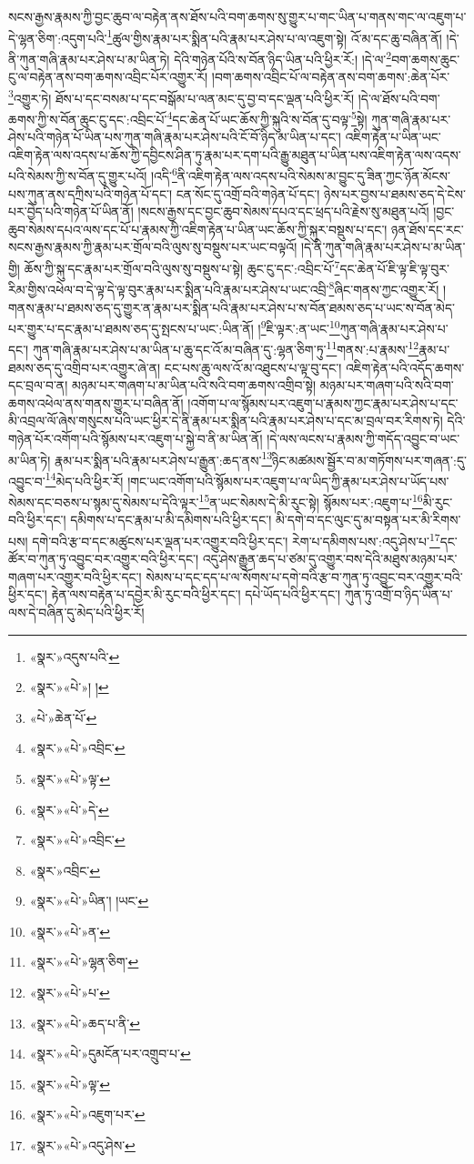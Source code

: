 སངས་རྒྱས་རྣམས་ཀྱི་བྱང་ཆུབ་ལ་བརྟེན་ནས་ཐོས་པའི་བག་ཆགས་སུ་གྱུར་པ་གང་ཡིན་པ་གནས་གང་ལ་འཇུག་པ་དེ་ལྷན་ཅིག་:འདུག་པའི་\footnote{«སྣར་»འདུས་པའི་}ཚུལ་གྱིས་རྣམ་པར་སྨིན་པའི་རྣམ་པར་ཤེས་པ་ལ་འཇུག་སྟེ། འོ་མ་དང་ཆུ་བཞིན་ནོ། །དེ་ནི་ཀུན་གཞི་རྣམ་པར་ཤེས་པ་མ་ཡིན་ཏེ། དེའི་གཉེན་པོའི་ས་བོན་ཉིད་ཡིན་པའི་ཕྱིར་རོ:། །དེ་ལ་\footnote{«སྣར་»«པེ་»། །}བག་ཆགས་ཆུང་ངུ་ལ་བརྟེན་ནས་བག་ཆགས་འབྲིང་པོར་འགྱུར་རོ། །བག་ཆགས་འབྲིང་པོ་ལ་བརྟེན་ནས་བག་ཆགས་:ཆེན་པོར་\footnote{«པེ་»ཆེན་པོ་}འགྱུར་ཏེ། ཐོས་པ་དང་བསམ་པ་དང་བསྒོམ་པ་ལན་མང་དུ་བྱ་བ་དང་ལྡན་པའི་ཕྱིར་རོ། །དེ་ལ་ཐོས་པའི་བག་ཆགས་ཀྱི་ས་བོན་ཆུང་ངུ་དང་:འབྲིང་པོ་\footnote{«སྣར་»«པེ་»འབྲིང་}དང་ཆེན་པོ་ཡང་ཆོས་ཀྱི་སྐུའི་ས་བོན་དུ་བལྟ་\footnote{«སྣར་»«པེ་»ལྟ་}སྟེ། ཀུན་གཞི་རྣམ་པར་ཤེས་པའི་གཉེན་པོ་ཡིན་པས་ཀུན་གཞི་རྣམ་པར་ཤེས་པའི་ངོ་བོ་ཉིད་མ་ཡིན་པ་དང་། འཇིག་རྟེན་པ་ཡིན་ཡང་འཇིག་རྟེན་ལས་འདས་པ་ཆོས་ཀྱི་དབྱིངས་ཤིན་ཏུ་རྣམ་པར་དག་པའི་རྒྱུ་མཐུན་པ་ཡིན་པས་འཇིག་རྟེན་ལས་འདས་པའི་སེམས་ཀྱི་ས་བོན་དུ་གྱུར་པའོ། །འདི་\footnote{«སྣར་»«པེ་»དེ་}ནི་འཇིག་རྟེན་ལས་འདས་པའི་སེམས་མ་བྱུང་དུ་ཟིན་ཀྱང་ཉོན་མོངས་པས་ཀུན་ནས་དཀྲིས་པའི་གཉེན་པོ་དང་། ངན་སོང་དུ་འགྲོ་བའི་གཉེན་པོ་དང་། ཉེས་པར་བྱས་པ་ཐམས་ཅད་དེ་ངེས་པར་བྱེད་པའི་གཉེན་པོ་ཡིན་ནོ། །སངས་རྒྱས་དང་བྱང་ཆུབ་སེམས་དཔའ་དང་ཕྲད་པའི་རྗེས་སུ་མཐུན་པའོ། །བྱང་ཆུབ་སེམས་དཔའ་ལས་དང་པོ་པ་རྣམས་ཀྱི་འཇིག་རྟེན་པ་ཡིན་ཡང་ཆོས་ཀྱི་སྐུར་བསྡུས་པ་དང་། ཉན་ཐོས་དང་རང་སངས་རྒྱས་རྣམས་ཀྱི་རྣམ་པར་གྲོལ་བའི་ལུས་སུ་བསྡུས་པར་ཡང་བལྟའོ། །དེ་ནི་ཀུན་གཞི་རྣམ་པར་ཤེས་པ་མ་ཡིན་གྱི། ཆོས་ཀྱི་སྐུ་དང་རྣམ་པར་གྲོལ་བའི་ལུས་སུ་བསྡུས་པ་སྟེ། ཆུང་ངུ་དང་:འབྲིང་པོ་\footnote{«སྣར་»«པེ་»འབྲིང་}དང་ཆེན་པོ་ཇི་ལྟ་ཇི་ལྟ་བུར་རིམ་གྱིས་འཕེལ་བ་དེ་ལྟ་དེ་ལྟ་བུར་རྣམ་པར་སྨིན་པའི་རྣམ་པར་ཤེས་པ་ཡང་འབྲི་\footnote{«སྣར་»འབྲིང་}ཞིང་གནས་ཀྱང་འགྱུར་རོ། །གནས་རྣམ་པ་ཐམས་ཅད་དུ་གྱུར་ན་རྣམ་པར་སྨིན་པའི་རྣམ་པར་ཤེས་པ་ས་བོན་ཐམས་ཅད་པ་ཡང་ས་བོན་མེད་པར་གྱུར་པ་དང་རྣམ་པ་ཐམས་ཅད་དུ་སྤངས་པ་ཡང་:ཡིན་ནོ། །\footnote{«སྣར་»«པེ་»ཡིན་། །ཡང་}ཇི་ལྟར་:ན་ཡང་\footnote{«སྣར་»«པེ་»ན་}ཀུན་གཞི་རྣམ་པར་ཤེས་པ་དང་། ཀུན་གཞི་རྣམ་པར་ཤེས་པ་མ་ཡིན་པ་ཆུ་དང་འོ་མ་བཞིན་དུ་:ལྷན་ཅིག་ཏུ་\footnote{«སྣར་»«པེ་»ལྷན་ཅིག་}གནས་:པ་རྣམས་\footnote{«སྣར་»«པེ་»པ་}རྣམ་པ་ཐམས་ཅད་དུ་འགྲིབ་པར་འགྱུར་ཞེ་ན། ངང་པས་ཆུ་ལས་འོ་མ་འཐུངས་པ་ལྟ་བུ་དང་། འཇིག་རྟེན་པའི་འདོད་ཆགས་དང་བྲལ་བ་ན། མཉམ་པར་གཞག་པ་མ་ཡིན་པའི་སའི་བག་ཆགས་འགྲིབ་སྟེ། མཉམ་པར་གཞག་པའི་སའི་བག་ཆགས་འཕེལ་ནས་གནས་གྱུར་པ་བཞིན་ནོ། །འགོག་པ་ལ་སྙོམས་པར་འཇུག་པ་རྣམས་ཀྱང་རྣམ་པར་ཤེས་པ་དང་མི་འབྲལ་ལོ་ཞེས་གསུངས་པའི་ཡང་ཕྱིར་དེ་ནི་རྣམ་པར་སྨིན་པའི་རྣམ་པར་ཤེས་པ་དང་མ་བྲལ་བར་རིགས་ཏེ། དེའི་གཉེན་པོར་འགོག་པའི་སྙོམས་པར་འཇུག་པ་སྐྱེ་བ་ནི་མ་ཡིན་ནོ། །དེ་ལས་ལངས་པ་རྣམས་ཀྱི་གདོད་འབྱུང་བ་ཡང་མ་ཡིན་ཏེ། རྣམ་པར་སྨིན་པའི་རྣམ་པར་ཤེས་པ་རྒྱུན་:ཆད་ནས་\footnote{«སྣར་»«པེ་»ཆད་པ་ནི་}ཉིང་མཚམས་སྦྱོར་བ་མ་གཏོགས་པར་གཞན་:དུ་འབྱུང་བ་\footnote{«སྣར་»«པེ་»དུམངོན་པར་འགྲུབ་པ་}མེད་པའི་ཕྱིར་རོ། །གང་ཡང་འགོག་པའི་སྙོམས་པར་འཇུག་པ་ལ་ཡིད་ཀྱི་རྣམ་པར་ཤེས་པ་ཡོད་པས་སེམས་དང་བཅས་པ་སྙམ་དུ་སེམས་པ་དེའི་ལྟར་\footnote{«སྣར་»«པེ་»ལྟ་}ན་ཡང་སེམས་དེ་མི་རུང་སྟེ། སྙོམས་པར་:འཇུག་པ་\footnote{«སྣར་»«པེ་»འཇུག་པར་}མི་རུང་བའི་ཕྱིར་དང་། དམིགས་པ་དང་རྣམ་པ་མི་དམིགས་པའི་ཕྱིར་དང་། མི་དགེ་བ་དང་ལུང་དུ་མ་བསྟན་པར་མི་རིགས་པས། དགེ་བའི་རྩ་བ་དང་མཚུངས་པར་ལྡན་པར་འགྱུར་བའི་ཕྱིར་དང་། རེག་པ་དམིགས་པས་:འདུ་ཤེས་པ་\footnote{«སྣར་»«པེ་»འདུ་ཤེས་}དང་ཚོར་བ་ཀུན་ཏུ་འབྱུང་བར་འགྱུར་བའི་ཕྱིར་དང་། འདུ་ཤེས་རྒྱུན་ཆད་པ་ཙམ་དུ་འགྱུར་བས་དེའི་མཐུས་མཉམ་པར་གཞག་པར་འགྱུར་བའི་ཕྱིར་དང་། སེམས་པ་དང་དད་པ་ལ་སོགས་པ་དགེ་བའི་རྩ་བ་ཀུན་ཏུ་འབྱུང་བར་འགྱུར་བའི་ཕྱིར་དང་། རྟེན་ལས་བརྟེན་པ་དབྱེར་མི་རུང་བའི་ཕྱིར་དང་། དཔེ་ཡོད་པའི་ཕྱིར་དང་། ཀུན་ཏུ་འགྲོ་བ་ཉིད་ཡིན་པ་ལས་དེ་བཞིན་དུ་མེད་པའི་ཕྱིར་རོ། 